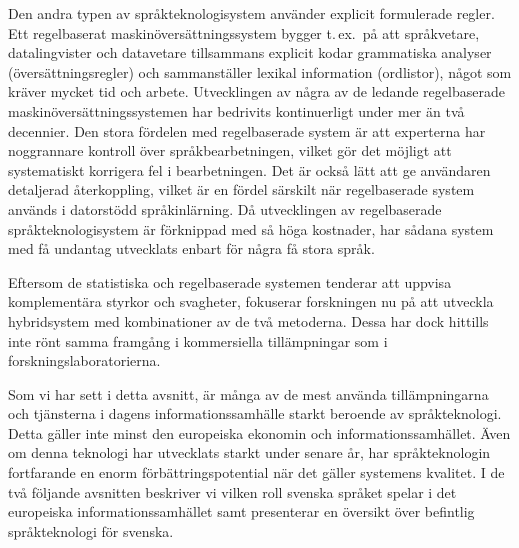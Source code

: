 \begin{multicols}{2}
Den andra typen av språkteknologisystem använder explicit formulerade
regler. Ett regelbaserat maskin\-över\-sätt\-nings\-system bygger
t.\,ex.~på att språkvetare, datalingvister och datavetare tillsammans
explicit kodar grammatiska analyser (översättningsregler) och
sammanställer lexikal information (ordlistor), något som kräver mycket
tid och arbete. Utvecklingen av några av de ledande regelbaserade
maskin\-över\-sätt\-ningssystemen har bedrivits kontinuerligt under mer än
två decennier. Den stora fördelen med regelbaserade system är att
experterna har noggrannare kontroll över språkbearbetningen, vilket
gör det möjligt att systematiskt korrigera fel i bearbetningen. Det är
också lätt att ge användaren detaljerad återkoppling, vilket är en
fördel särskilt när regelbaserade system används i datorstödd
språkinlärning. Då utvecklingen av regelbaserade
språkteknologisystem är förknippad med så höga kostnader, har sådana
system med få undantag utvecklats enbart för några få stora språk.

Eftersom de statistiska och regelbaserade systemen tenderar att
uppvisa komplementära styrkor och svagheter, fokuserar forskningen nu
på att utveckla hybridsystem med kombinationer av de två
metoderna. Dessa har dock hittills inte rönt samma framgång i
kommersiella tillämpningar som i forskningslaboratorierna.


Som vi har sett i detta avsnitt, är många av de mest använda
tillämpningarna och tjänsterna i dagens informationssamhälle starkt
beroende av språkteknologi. Detta gäller inte minst den europeiska
ekonomin och informationssamhället. Även om denna teknologi har
utvecklats starkt under senare år, har språkteknologin fortfarande en
enorm förbättringspotential när det gäller sys\-tem\-ens kvalitet. I de
två följande avsnitten beskriver vi vilken roll svenska språket spelar
i det europeiska informationssamhället samt presenterar en översikt
över befintlig språkteknologi för svenska.
\end{multicols}

\clearpage



